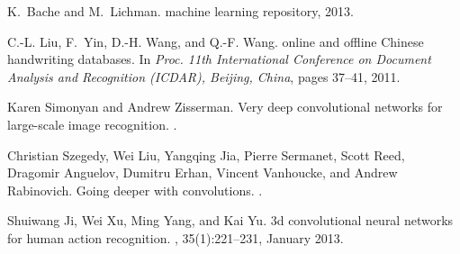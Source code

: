 \documentclass{article}
\numberwithin{equation}{subsection}
\begin{document}
\begin{thebibliography}{10}
K.~Bache and M.~Lichman.
 machine learning repository, 2013.

C.-L. Liu, F.~Yin, D.-H. Wang, and Q.-F. Wang.
 online and offline {C}hinese handwriting databases.
\newblock In {\em Proc. 11th International Conference on Document Analysis and
  Recognition (ICDAR), Beijing, China}, pages 37--41, 2011.

Karen Simonyan and Andrew Zisserman.
\newblock Very deep convolutional networks for large-scale image recognition.
.

Christian Szegedy, Wei Liu, Yangqing Jia, Pierre Sermanet, Scott Reed, Dragomir
  Anguelov, Dumitru Erhan, Vincent Vanhoucke, and Andrew Rabinovich.
\newblock Going deeper with convolutions.
.

Shuiwang Ji, Wei Xu, Ming Yang, and Kai Yu.
\newblock 3d convolutional neural networks for human action recognition.
, 35(1):221--231,
  January 2013.

\end{thebibliography}
\end{document}
